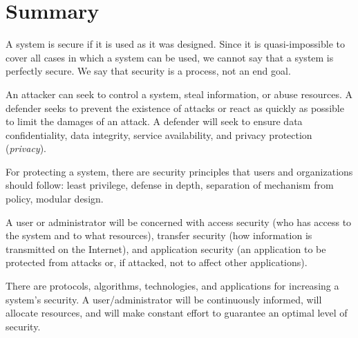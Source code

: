 \section{Summary}
\label{sec:sec:summary}

A system is secure if it is used as it was designed.
Since it is quasi-impossible to cover all cases in which a system can be used, we cannot say that a system is perfectly secure.
We say that security is a process, not an end goal.

An attacker can seek to control a system, steal information, or abuse resources.
A defender seeks to prevent the existence of attacks or react as quickly as possible to limit the damages of an attack.
A defender will seek to ensure data confidentiality, data integrity, service availability, and privacy protection (\textit{privacy}).

For protecting a system, there are security principles that users and organizations should follow: least privilege, defense in depth, separation of mechanism from policy, modular design.

A user or administrator will be concerned with access security (who has access to the system and to what resources), transfer security (how information is transmitted on the Internet), and application security (an application to be protected from attacks or, if attacked, not to affect other applications).

There are protocols, algorithms, technologies, and applications for increasing a system's security.
A user/administrator will be continuously informed, will allocate resources, and will make constant effort to guarantee an optimal level of security. 